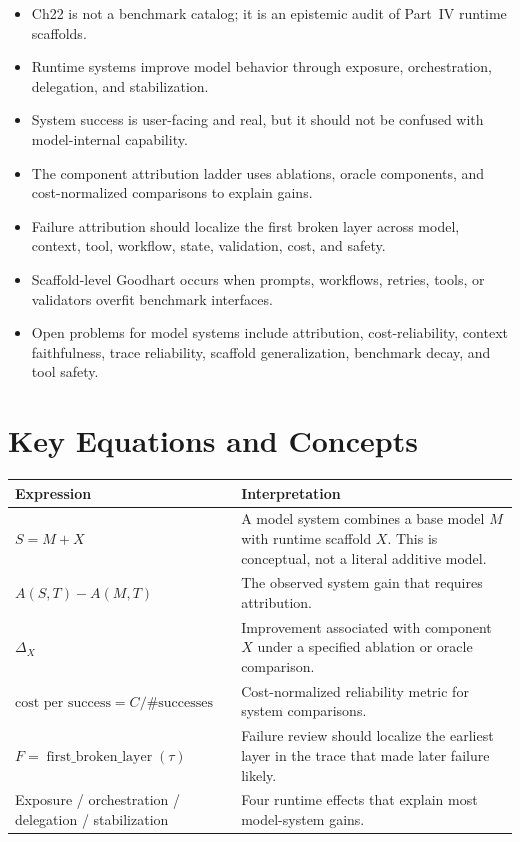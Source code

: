 \begin{takeaways}
\begin{itemize}
  \item Ch22 is not a benchmark catalog; it is an epistemic audit of Part~IV runtime scaffolds.
  \item Runtime systems improve model behavior through exposure, orchestration, delegation, and stabilization.
  \item System success is user-facing and real, but it should not be confused with model-internal capability.
  \item The component attribution ladder uses ablations, oracle components, and cost-normalized comparisons to explain gains.
  \item Failure attribution should localize the first broken layer across model, context, tool, workflow, state, validation, cost, and safety.
  \item Scaffold-level Goodhart occurs when prompts, workflows, retries, tools, or validators overfit benchmark interfaces.
  \item Open problems for model systems include attribution, cost-reliability, context faithfulness, trace reliability, scaffold generalization, benchmark decay, and tool safety.
\end{itemize}
\end{takeaways}

\section*{Key Equations and Concepts}

\begin{center}
\begin{tabularx}{\textwidth}{@{}lX@{}}
\toprule
\textbf{Expression} & \textbf{Interpretation} \\
\midrule
$S = M + X$ & A model system combines a base model $M$ with runtime scaffold $X$. This is conceptual, not a literal additive model. \\
$A(S,T) - A(M,T)$ & The observed system gain that requires attribution. \\
$\Delta_X$ & Improvement associated with component $X$ under a specified ablation or oracle comparison. \\
$\text{cost per success} = C / \#\text{successes}$ & Cost-normalized reliability metric for system comparisons. \\
$F = \operatorname{first\_broken\_layer}(\tau)$ & Failure review should localize the earliest layer in the trace that made later failure likely. \\
Exposure / orchestration / delegation / stabilization & Four runtime effects that explain most model-system gains. \\
\bottomrule
\end{tabularx}
\end{center}

